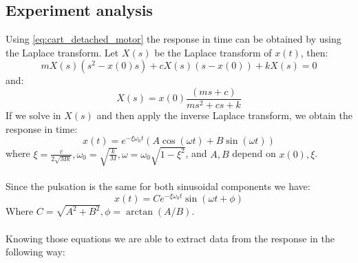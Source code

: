 \subsection{Experiment analysis}
Using \ref{eq:cart_detached_motor} the response in time can be obtained by using the Laplace transform. Let $X(s)$ be the Laplace transform of $x(t)$, then:
$$mX(s)(s^2-x(0)s) +c X(s) (s-x(0)) +kX(s)=0$$
and:
$$X(s) = x(0) \frac{(ms+c)}{ms^2+cs+k}$$
If we solve in $X(s)$ and then apply the inverse Laplace transform, we obtain the response in time:
$$x(t) = e^{-\xi \omega_0 t}(A\cos(\omega t)+B\sin(\omega t))$$
where $\xi = \frac{c}{2\sqrt{Mk}}, \omega_0 = \sqrt{\frac{k}{M}}, \omega = \omega_0 \sqrt{1-\xi^2}$, and $A,B$ depend on $x(0), \xi$. \\ \\
Since the pulsation is the same for both sinusoidal components we have:
$$x(t) = C e^{-\xi \omega_0 t} \sin(\omega t+ \phi)$$
Where  $C= \sqrt{A^2+B^2}, \phi = \arctan(A/B)$.
\\ \\
Knowing those equations we  are able to extract data from the response in the following way:
